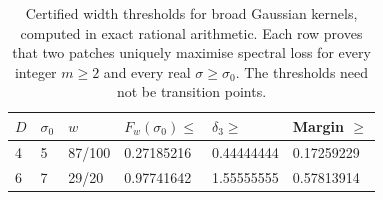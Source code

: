 \begin{table}[htbp]
\centering
\caption{Certified width thresholds for broad Gaussian kernels, computed in exact rational arithmetic. Each row proves that two patches uniquely maximise spectral loss for every integer $m\geq2$ and every real $\sigma\geq\sigma_0$. The thresholds need not be transition points.}
\label{tab:broad_kernel}
\begin{tabular}{llllll}
\toprule
$D$ & $\sigma_0$ & $w$ & $F_w(\sigma_0)\leq$ & $\delta_3\geq$ & Margin $\geq$ \\
\midrule
4 & 5 & 87/100 & 0.27185216 & 0.44444444 & 0.17259229 \\
6 & 7 & 29/20 & 0.97741642 & 1.55555555 & 0.57813914 \\
\bottomrule
\end{tabular}
\end{table}
